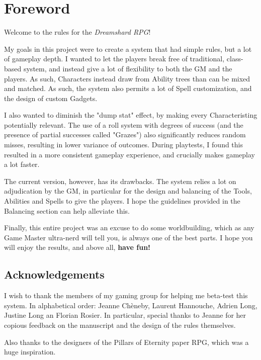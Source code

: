 \chapter*{Foreword}

Welcome to the rules for the \textit{Dreamshard RPG}!

My goals in this project were to create a system that had simple rules, but a lot of gameplay depth. I wanted to let the players break free of traditional, class-based system, and instead give a lot of flexibility to both the GM and the players. As such, Characters instead draw from Ability trees than can be mixed and matched. As such, the system also permits a lot of Spell customization, and the design of custom Gadgets. 

I also wanted to diminish the "dump stat" effect, by making every Characteristing potentially relevant. The use of a roll system with degrees of success (and the presence of partial successes called "Grazes") also significantly reduces random misses, resulting in lower variance of outcomes. During playtests, I found this resulted in a more consistent gameplay experience, and crucially makes gameplay a lot faster.

The current version, however, has its drawbacks. The system relies a lot on adjudication by the GM, in particular for the design and balancing of the Tools, Abilities and Spells to give the players. I hope the guidelines provided in the Balancing section can help alleviate this.

Finally, this entire project was an excuse to do some worldbuilding, which as any Game Master ultra-nerd will tell you, is always one of the best parts. I hope you will enjoy the results, and above all, \textbf{have fun!}



\section*{Acknowledgements}

I wish to thank the members of my gaming group for helping me beta-test this system. In alphabetical order: Jeanne Chèneby, Laurent Hannouche, Adrien Long, Justine Long an Florian Rosier. In particular, special thanks to Jeanne for her copious feedback on the manuscript and the design of the rules themselves.

Also thanks to the designers of the Pillars of Eternity paper RPG, which was a huge inspiration.

